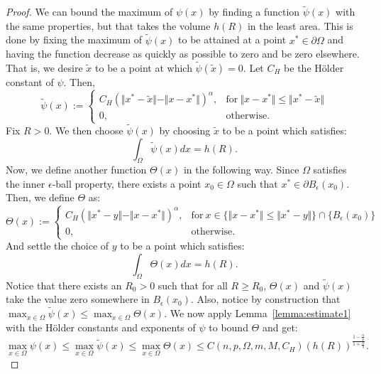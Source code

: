 \documentclass{amsart}
\theoremstyle{lemma}
\theoremstyle{remark}
\begin{document}
\begin{proof}
We can bound the maximum of $\psi(x)$ by finding a function $\tilde{\psi}(x)$ with the same properties, but that takes the volume $h(R)$ in the least area. This is done by fixing the maximum of $\tilde{\psi}(x)$ to be attained at a point $x^{*} \in \partial \Omega$ and having the function decrease as quickly as possible to zero and be zero elsewhere. That is, we desire $\tilde{x}$ to be a point at which $\tilde{\psi}(\tilde{x}) = 0$. Let $C_{H}$ be the H\"{o}lder constant of $\psi$. Then,
\begin{equation}\label{eq:tildepsi}
\tilde{\psi}(x) := \begin{cases}
C_{H}(\Vert x^{*} - \tilde{x} \Vert - \Vert x - x^{*} \Vert)^{\alpha}, &\text{for} \ \Vert x - x^{*} \Vert \leq \Vert x^{*} - \tilde{x} \Vert \\
0, &\text{otherwise}.
\end{cases}
\end{equation}
Fix $R>0$. We then choose $\tilde{\psi}(x)$ by choosing $\tilde{x}$ to be a point which satisfies:
\begin{equation}
\int_{\Omega} \tilde{\psi}(x)dx = h(R).
\end{equation}
Now, we define another function $\Theta(x)$ in the following way. Since $\Omega$ satisfies the inner $\epsilon$-ball property, there exists a point $x_0 \in \Omega$ such that $x^{*} \in \partial B_{\epsilon}(x_0)$. Then, we define $\Theta$ as:
\begin{equation}
\Theta(x) := \begin{cases}
C_{H}(\Vert x^{*} - y \Vert - \Vert x - x^{*} \Vert)^{\alpha}, &\text{for} \  x \in \{\Vert x - x^{*} \Vert \leq \Vert x^{*} - y \Vert\} \cap \{ B_{\epsilon}(x_0) \} \\
0, &\text{otherwise}.
\end{cases}
\end{equation}
And settle the choice of $y$ to be a point which satisfies:
\begin{equation}
\int_{\Omega} \Theta(x)dx = h(R).
\end{equation}
Notice that there exists an $R_0>0$ such that for all $R \geq R_0$, $\Theta(x)$ and $\tilde{\psi}(x)$ take the value zero somewhere in $B_{\epsilon}(x_0)$. Also, notice by construction that $\max_{x \in \Omega} \tilde{\psi}(x) \leq \max_{x \in \Omega} \Theta(x)$. We now apply Lemma~\ref{lemma:estimate1} with the H\"{o}lder constants and exponents of $\psi$ to bound $\Theta$ and get:
\begin{equation}
\max_{x \in \Omega} \psi(x) \leq \max_{x \in \Omega} \tilde{\psi}(x) \leq \max_{x \in \Omega} \Theta(x) \leq C(n, p, \Omega, m, M, C_H) (h(R))^{\frac{1-\frac{n}{p}}{1+\frac{n}{q}}}.
\end{equation}
\end{proof}
\end{document}
